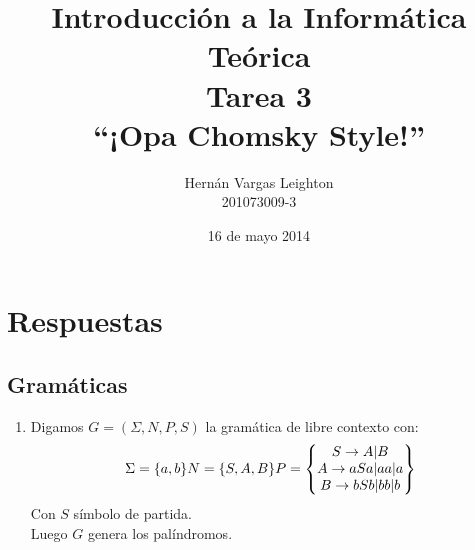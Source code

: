 \documentclass[spanish, fleqn]{article}
\title{
	Introducción a la Informática Teórica \\
	Tarea 3 \\
	``¡Opa Chomsky Style!''
	}
\author{
	Hernán Vargas Leighton \\
	201073009-3
	}
\date{16 de mayo 2014}
\begin{document}
	\maketitle
	\thispagestyle{empty}
	\section*{Respuestas}
	\subsection*{Gramáticas}
		\begin{enumerate}
			\item 
				Digamos $G = (\Sigma, N, P, S)$ la gramática de libre 
				contexto con:
				\begin{equation*}
					\Sigma = \{ a, b\} \\
					N = \{S, A, B\} \\
					P =
					\begin{Bmatrix}
						S \rightarrow A|B \\
						A \rightarrow aSa|aa|a \\
						B \rightarrow bSb|bb|b
					\end{Bmatrix}
				\end{equation*}
				Con $S$ símbolo de partida.\\
				Luego $G$ genera los palíndromos.


\end{enumerate}
\end{document}
